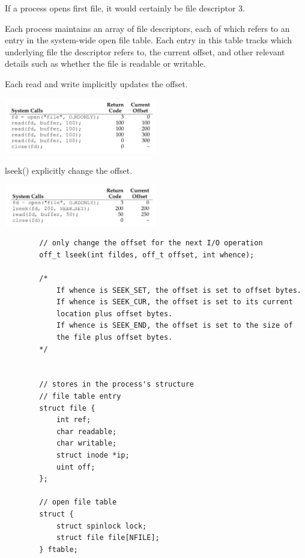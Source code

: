         If a process opens first file, it would certainly be file descriptor 3.

        Each process maintains an array of file descriptors, each of which 
        refers to an entry in the system-wide open file table.
        Each entry in this table tracks which underlying file the descriptor refers to,
         the current offset, 
         and other relevant details such as whether the file is readable or writable.




        Each read and write implicitly updates the offset.

        \includegraphics[width=0.5\textwidth]{chapters/Persistence/persistence/use_read.png}


        lseek() explicitly change the offset.

        \includegraphics[width=0.5\textwidth]{chapters/Persistence/persistence/lseek.png}


    \begin{lstlisting}
        // only change the offset for the next I/O operation
        off_t lseek(int fildes, off_t offset, int whence);

        /*
            If whence is SEEK_SET, the offset is set to offset bytes.
            If whence is SEEK_CUR, the offset is set to its current
            location plus offset bytes.
            If whence is SEEK_END, the offset is set to the size of
            the file plus offset bytes.
        */


        // stores in the process's structure
        // file table entry
        struct file {
            int ref;
            char readable;
            char writable;
            struct inode *ip;
            uint off;
        };

        // open file table  
        struct {
            struct spinlock lock;
            struct file file[NFILE];
        } ftable;
    \end{lstlisting}

